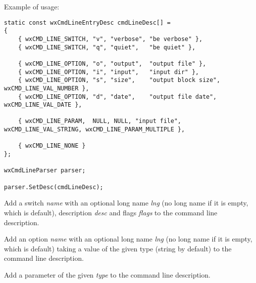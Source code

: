 Example of usage:

\begin{verbatim}
static const wxCmdLineEntryDesc cmdLineDesc[] =
{
    { wxCMD_LINE_SWITCH, "v", "verbose", "be verbose" },
    { wxCMD_LINE_SWITCH, "q", "quiet",   "be quiet" },

    { wxCMD_LINE_OPTION, "o", "output",  "output file" },
    { wxCMD_LINE_OPTION, "i", "input",   "input dir" },
    { wxCMD_LINE_OPTION, "s", "size",    "output block size", wxCMD_LINE_VAL_NUMBER },
    { wxCMD_LINE_OPTION, "d", "date",    "output file date", wxCMD_LINE_VAL_DATE },

    { wxCMD_LINE_PARAM,  NULL, NULL, "input file", wxCMD_LINE_VAL_STRING, wxCMD_LINE_PARAM_MULTIPLE },

    { wxCMD_LINE_NONE }
};

wxCmdLineParser parser;

parser.SetDesc(cmdLineDesc);
\end{verbatim}

\label{wxcmdlineparseraddswitch}


Add a switch {\it name} with an optional long name {\it lng} (no long name if it
is empty, which is default), description {\it desc} and flags {\it flags} to the
command line description.

\label{wxcmdlineparseraddoption}


Add an option {\it name} with an optional long name {\it lng} (no long name if
it is empty, which is default) taking a value of the given type (string by
default) to the command line description.

\label{wxcmdlineparseraddparam}


Add a parameter of the given {\it type} to the command line description.

